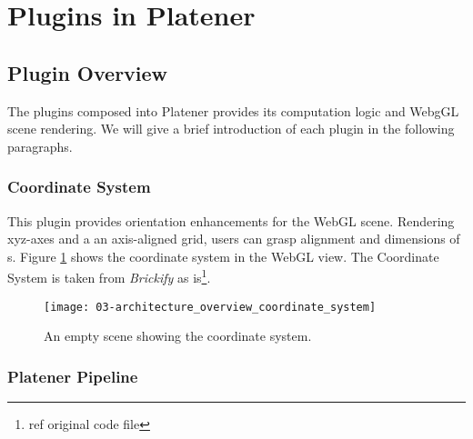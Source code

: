 \documentclass[../ClassicThesis.tex]{subfiles}
\begin{document}


\section{Plugins in Platener}

\subsection{Plugin Overview}


The plugins composed into Platener provides its computation logic and WebgGL
scene rendering. We will give a brief introduction of each plugin in the
following paragraphs.

\subsubsection{Coordinate System}

This plugin provides orientation enhancements for the WebGL scene. Rendering
xyz-axes and a an axis-aligned grid, users can grasp alignment and dimensions of
{\threedmodel}s. Figure \ref{fig:architecture_overview_coordinate_system} shows
the coordinate system in the WebGL view. The Coordinate System is taken from
\emph{Brickify} as is\footnote{ref original code file}.

\begin{figure}
  \texttt{[image: 03-architecture\_overview\_coordinate\_system]}
  \caption{An empty scene showing the coordinate system.}
  \label{fig:architecture_overview_coordinate_system}
\end{figure}

\subsubsection{Platener Pipeline}
\end{document}
